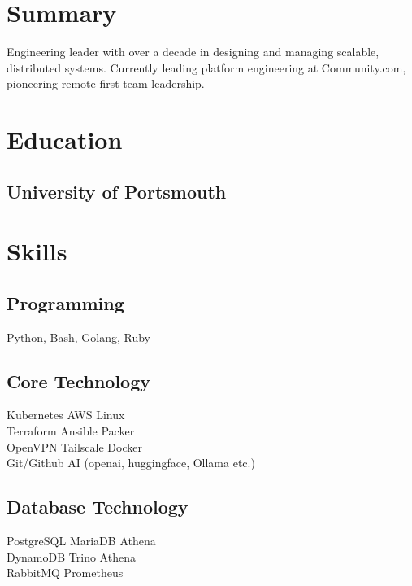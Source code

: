 \documentclass[]{danpilch-resume}
\begin{document}
\hfill
\begin{minipage}[t]{0.33\textwidth}


\section{Summary}
Engineering leader with over a decade in designing and managing scalable, distributed systems. Currently leading platform engineering at Community.com, pioneering remote-first team leadership.
\sectionsep


\section{Education}

\subsection{University of Portsmouth}
\sectionsep


\section{Skills}
\subsection{Programming}
Python, Bash, Golang, Ruby
\sectionsep

\subsection{Core Technology}
Kubernetes \textbullet{} AWS \textbullet{} Linux \\
Terraform \textbullet{} Ansible \textbullet{} Packer \\
OpenVPN \textbullet{} Tailscale \textbullet{} Docker \\
Git/Github \textbullet{} AI (openai, huggingface, Ollama etc.) \\
\sectionsep

\subsection{Database Technology}
PostgreSQL \textbullet{} MariaDB \textbullet{} Athena \\
DynamoDB \textbullet{} Trino \textbullet{} Athena \\ 
RabbitMQ \textbullet{} Prometheus \\
\sectionsep


\end{minipage}
\end{document}
